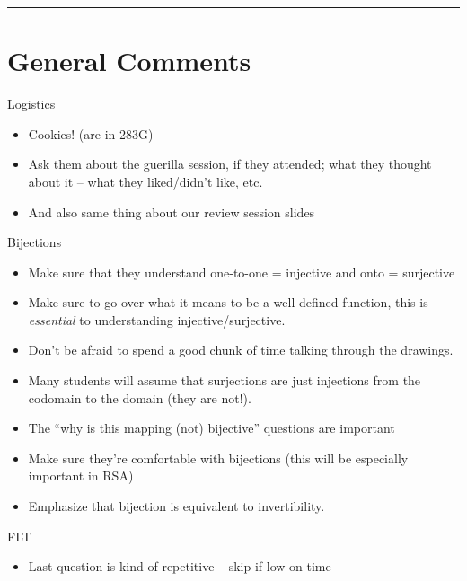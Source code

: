 \documentclass{exam}
\title{}
\date{Bijections, FLT, RSA, Polynomials, Secret Sharing}
\begin{document}
\maketitle
\rule{\textwidth}{0.15em}
\fontsize{12}{15}\selectfont
\thispagestyle{empty}


\section{General Comments}
\begin{questions}
\item Logistics
\begin{itemize}
\item Cookies! (are in 283G)
\item Ask them about the guerilla session, if they attended; what they thought about it – what they liked/didn’t like, etc.
\item And also same thing about our review session slides
\end{itemize}
\item Bijections
\begin{itemize}
\item Make sure that they understand one-to-one = injective and onto = surjective
\item Make sure to go over what it means to be a well-defined function, this is \textit{essential} to understanding injective/surjective.
\item Don't be afraid to spend a good chunk of time talking through the drawings.
\item Many students will assume that surjections are just injections from the codomain to the domain (they are not!).
\item The “why is this mapping (not) bijective” questions are important
\item Make sure they’re comfortable with bijections (this will be especially important in RSA)
\item Emphasize that bijection is equivalent to invertibility.
\end{itemize}
\item FLT
\begin{itemize}
\item Last question is kind of repetitive – skip if low on time
\end{itemize}


\end{questions}
\end{document}
